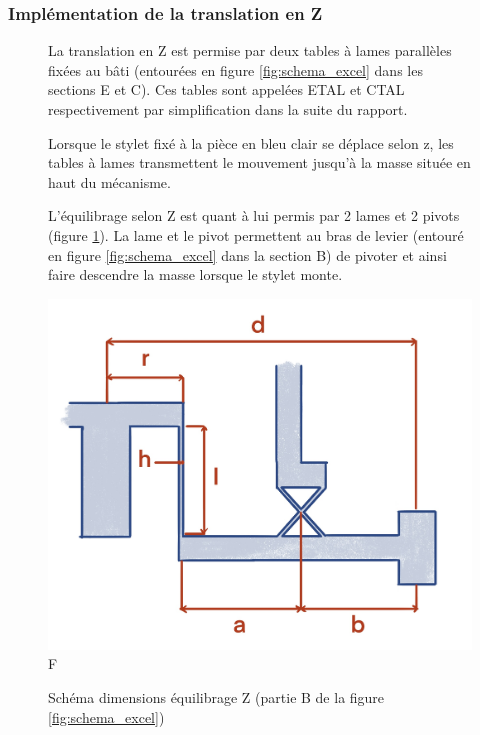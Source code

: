 \documentclass[a4paper, 11pt]{article} %
\begin{document}
\subsubsection*{Implémentation de la translation en Z}
\begin{figure}[H]
    \centering
    \begin{minipage}[t]{0.58\linewidth}
    \vspace{0pt}
        La translation en Z est permise par deux tables à lames parallèles fixées au bâti (entourées en figure \ref{fig:schema_excel} dans les sections E et C). Ces tables sont appelées ETAL et CTAL respectivement par simplification dans la suite du rapport.

        Lorsque le stylet fixé à la pièce en bleu clair se déplace selon z, les tables à lames transmettent le mouvement jusqu'à la masse située en haut du mécanisme.

        L'équilibrage selon Z est quant à lui permis par 2 lames et 2 pivots (figure \ref{fig:bras_levier}). La lame et le pivot permettent au bras de levier (entouré en figure \ref{fig:schema_excel} dans la section B) de pivoter et ainsi faire descendre la masse lorsque le stylet monte.
    \end{minipage}
    \hfill
    \begin{minipage}[t]{0.38\linewidth}
        \vspace{0pt}
        \centering
        \includegraphics[width=\linewidth]{Bras_de_levier.jpeg}F
        \caption{Schéma dimensions équilibrage Z (partie B de la figure \ref{fig:schema_excel})}
        \label{fig:bras_levier}
    \end{minipage}
\end{figure}
\end{document}
